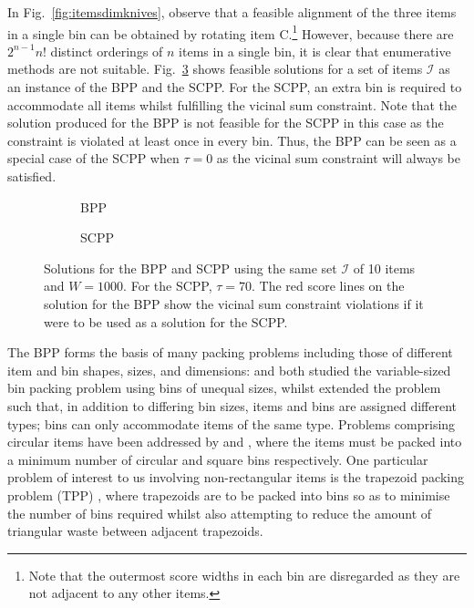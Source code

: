 \documentclass[a4paper,11pt,authoryear]{elsarticle}
\begin{document}

In Fig.~\ref{fig:itemsdimknives}, observe that a feasible alignment of the three items in a single bin can be obtained by rotating item C.\footnote{Note that the outermost score widths in each bin are disregarded as they are not adjacent to any other items.} However, because there are $2^{n-1} n!$ distinct orderings of $n$ items in a single bin, it is clear that enumerative methods are not suitable. Fig.~\ref{fig:bppvscpp} shows feasible solutions for a set of items $\mathcal{I}$ as an instance of the BPP and the SCPP. For the SCPP, an extra bin is required to accommodate all items whilst fulfilling the vicinal sum constraint. Note that the solution produced for the BPP is not feasible for the SCPP in this case as the constraint is violated at least once in every bin. Thus, the BPP can be seen as a special case of the SCPP when $\tau=0$ as the vicinal sum constraint will always be satisfied.

\begin{figure}[H]
	\centering	
	\begin{subfigure}[h]{0.42\textwidth}
		
		\caption{BPP}
		\label{fig:bpp}
	\end{subfigure} \hspace{10mm}
	\begin{subfigure}[h]{0.42\textwidth}
		
		\caption{SCPP}
		\label{fig:scpp}
	\end{subfigure}
	\caption{Solutions for the BPP and SCPP using the same set $\mathcal{I}$ of 10 items and $W = 1000$. For the SCPP, $\tau = 70$. The red score lines on the solution for the BPP show the vicinal sum constraint violations if it were to be used as a solution for the SCPP.}	
	\label{fig:bppvscpp}
\end{figure}

\noindent The BPP forms the basis of many packing problems including those of different item and bin shapes, sizes, and dimensions: \citet{haouari2009} and \citet{liu2021} both studied the variable-sized bin packing problem using bins of unequal sizes, whilst \citet{zhou2009} extended the problem such that, in addition to differing bin sizes, items and bins are assigned different types; bins can only accommodate items of the same type. Problems comprising circular items have been addressed by \citet{yuan2021} and \citet{he2021}, where the items must be packed into a minimum number of circular and square bins respectively. One particular problem of interest to us involving non-rectangular items is the trapezoid packing problem (TPP) \citep{lewis2011, lewis2017}, where trapezoids are to be packed into bins so as to minimise the number of bins required whilst also attempting to reduce the amount of triangular waste between adjacent trapezoids.
\end{document}
